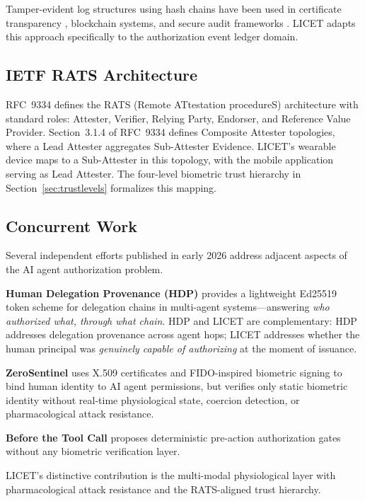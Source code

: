 \documentclass[12pt,a4paper]{article}
\begin{document}
Tamper-evident log structures using hash chains have been used in certificate
transparency \cite{laurie2014}, blockchain systems, and secure audit frameworks
\cite{schneier1998secure}. LICET adapts this approach specifically to the
authorization event ledger domain.

\subsection{IETF RATS Architecture}

RFC~9334 \cite{rfc9334} defines the RATS (Remote ATtestation procedureS)
architecture with standard roles: Attester, Verifier, Relying Party, Endorser,
and Reference Value Provider. Section~3.1.4 of RFC~9334 defines Composite
Attester topologies, where a Lead Attester aggregates Sub-Attester Evidence.
LICET's wearable device maps to a Sub-Attester in this topology, with the
mobile application serving as Lead Attester. The four-level biometric trust
hierarchy in Section~\ref{sec:trustlevels} formalizes this mapping.

\subsection{Concurrent Work}

Several independent efforts published in early 2026 address adjacent aspects of
the AI agent authorization problem.

\textbf{Human Delegation Provenance (HDP)} \cite{hdp2026} provides a
lightweight Ed25519 token scheme for delegation chains in multi-agent
systems---answering \emph{who authorized what, through what chain}. HDP and
LICET are complementary: HDP addresses delegation provenance across agent hops;
LICET addresses whether the human principal was \emph{genuinely capable of
authorizing} at the moment of issuance.

\textbf{ZeroSentinel} \cite{zerosentinel2026} uses X.509 certificates and
FIDO-inspired biometric signing to bind human identity to AI agent permissions,
but verifies only static biometric identity without real-time physiological
state, coercion detection, or pharmacological attack resistance.

\textbf{Before the Tool Call} \cite{beforetoolcall2026} proposes deterministic
pre-action authorization gates without any biometric verification layer.

LICET's distinctive contribution is the multi-modal physiological layer with
pharmacological attack resistance and the RATS-aligned trust hierarchy.
\end{document}

